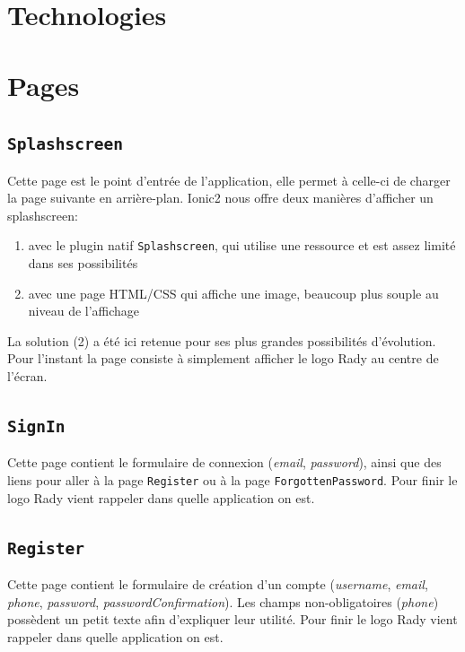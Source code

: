 \documentclass[french]{article}
\begin{document}
	\section{Technologies}
		
	\section{Pages}
		
		\subsection{\texttt{Splashscreen}}
			Cette page est le point d'entrée de l'application, elle permet à celle-ci de charger la page suivante en arrière-plan. Ionic2 nous offre deux manières d'afficher un splashscreen:
			\begin{enumerate}
				\item avec le plugin natif \texttt{Splashscreen}, qui utilise une ressource et est assez limité dans ses possibilités
				\item avec une page HTML/CSS qui affiche une image, beaucoup plus souple au niveau de l'affichage
			\end{enumerate}
			La solution (2) a été ici retenue pour ses plus grandes possibilités d'évolution.\\
			
			Pour l'instant la page consiste à simplement afficher le logo Rady au centre de l'écran.
			
		\subsection{\texttt{SignIn}}
			Cette page contient le formulaire de connexion (\textit{email}, \textit{password}), ainsi que des liens pour aller à la page \texttt{Register} ou à la page \texttt{ForgottenPassword}. Pour finir le logo Rady vient rappeler dans quelle application on est.
		
		\subsection{\texttt{Register}}
			Cette page contient le formulaire de création d'un compte (\textit{username}, \textit{email}, \textit{phone}, \textit{password}, \textit{passwordConfirmation}). Les champs non-obligatoires (\textit{phone}) possèdent un petit texte afin d'expliquer leur utilité. Pour finir le logo Rady vient rappeler dans quelle application on est. 
		
			
\end{document}

